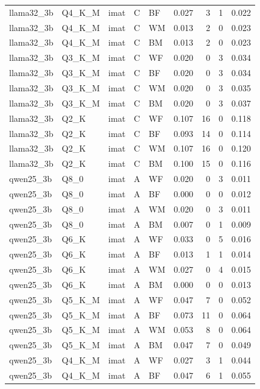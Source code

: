 \begin{tabular}{lllllrrrr}
llama32\_3b & Q4\_K\_M & imat & C & BF & 0.027 & 3 & 1 & 0.022 \\
llama32\_3b & Q4\_K\_M & imat & C & WM & 0.013 & 2 & 0 & 0.023 \\
llama32\_3b & Q4\_K\_M & imat & C & BM & 0.013 & 2 & 0 & 0.023 \\
llama32\_3b & Q3\_K\_M & imat & C & WF & 0.020 & 0 & 3 & 0.034 \\
llama32\_3b & Q3\_K\_M & imat & C & BF & 0.020 & 0 & 3 & 0.034 \\
llama32\_3b & Q3\_K\_M & imat & C & WM & 0.020 & 0 & 3 & 0.035 \\
llama32\_3b & Q3\_K\_M & imat & C & BM & 0.020 & 0 & 3 & 0.037 \\
llama32\_3b & Q2\_K & imat & C & WF & 0.107 & 16 & 0 & 0.118 \\
llama32\_3b & Q2\_K & imat & C & BF & 0.093 & 14 & 0 & 0.114 \\
llama32\_3b & Q2\_K & imat & C & WM & 0.107 & 16 & 0 & 0.120 \\
llama32\_3b & Q2\_K & imat & C & BM & 0.100 & 15 & 0 & 0.116 \\
qwen25\_3b & Q8\_0 & imat & A & WF & 0.020 & 0 & 3 & 0.011 \\
qwen25\_3b & Q8\_0 & imat & A & BF & 0.000 & 0 & 0 & 0.012 \\
qwen25\_3b & Q8\_0 & imat & A & WM & 0.020 & 0 & 3 & 0.011 \\
qwen25\_3b & Q8\_0 & imat & A & BM & 0.007 & 0 & 1 & 0.009 \\
qwen25\_3b & Q6\_K & imat & A & WF & 0.033 & 0 & 5 & 0.016 \\
qwen25\_3b & Q6\_K & imat & A & BF & 0.013 & 1 & 1 & 0.014 \\
qwen25\_3b & Q6\_K & imat & A & WM & 0.027 & 0 & 4 & 0.015 \\
qwen25\_3b & Q6\_K & imat & A & BM & 0.000 & 0 & 0 & 0.013 \\
qwen25\_3b & Q5\_K\_M & imat & A & WF & 0.047 & 7 & 0 & 0.052 \\
qwen25\_3b & Q5\_K\_M & imat & A & BF & 0.073 & 11 & 0 & 0.064 \\
qwen25\_3b & Q5\_K\_M & imat & A & WM & 0.053 & 8 & 0 & 0.064 \\
qwen25\_3b & Q5\_K\_M & imat & A & BM & 0.047 & 7 & 0 & 0.049 \\
qwen25\_3b & Q4\_K\_M & imat & A & WF & 0.027 & 3 & 1 & 0.044 \\
qwen25\_3b & Q4\_K\_M & imat & A & BF & 0.047 & 6 & 1 & 0.055 \\

\end{tabular}

